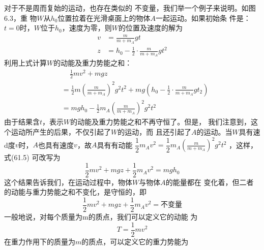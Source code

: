 对于不是周而复始的运动，也存在类似的
不变量，我们举一个例子来说明。如图6.3，重
物$ W $从$ h _ { 0 } $位置拉着在光滑桌面上的物体$ A $一起运动。如果初始条
件是：$ t = 0 $时，$ W $位于$ h _ { 0 } $，速度为零，则$ W $的位置及速度的解为
\begin{equation*}
 \begin{aligned}
 v &= \frac { m } { m + m _ { A } } g t \\
 z &= h _ { 0 } - \frac { 1 } { 2 } \cdot \frac { m } { m + m _ { A } } g t ^ { 2 }
 \end{aligned}
\end{equation*}
利用上式计算$ W $的动能及重力势能之和：
{\setlength{\mathindent}{2em}
\begin{equation}\label{eqn:06.01.05}
 \begin{aligned}
 &\quad \, \frac { 1 } { 2 } m v ^ { 2 } + m g z \\
 &= \frac { 1 } { 2 } m \left( \frac { m } { m + m _ { A } } \right) ^ { 2 } g ^ { 2 } t ^ { 2 } + m g \left( h _ { 0 } - \frac { 1 } { 2 } \cdot \frac { m } { m + m _ { A } } g t _ { 2 } \right) \\
 &= m g h _ { 0 } - \frac { 1 } { 2 } m _ { A } \left( \frac { m } { m + m _ { A } } \right) ^ { 2 } g ^ { 2 } t ^ { 2 }
 \end{aligned}
\end{equation}}
由于结果含$ t $，表示$ W $的动能及重力势能之和不再守恒了。但是，
我们注意到，这个运动所产生的后果，不仅引起了$ W $的运动，而
且还引起了$ A $的运动。当$ W $具有速d度$ v $时，$ A $也具有速度$ v $，故$ A $具有有动能
$ \dfrac { 1 } { 2 } m _ { A } v ^ { 2 } = \dfrac { 1 } { 2 } m _ { A } \left( \frac { m } { m + m _ { A } } \right) ^ { 2 } g ^ { 2 } t ^ { 2 } $
，这样，式(61.5)
可改写为
\begin{equation*}
 \frac { 1 } { 2 } m v ^ { 2 } + m g z + \frac { 1 } { 2 } m _ { A } v ^ { 2 } = m g h _ { 0 }
\end{equation*}
这个结果告诉我们，在运动过程中，物体$ W $与物体$ A $的能量都在
变化着，但二者的动能与重力势能之和不变化，是守恒的，即
\begin{equation}\label{eqn:06.01.06}
 \frac { 1 } { 2 } m v ^ { 2 } + m g z + \frac { 1 } { 2 } m _ { A } v ^ { 2 } = \text{不变量}
\end{equation}
一般地说，对每个质量为m的质点，我们可以定义它的动能
为
\begin{equation*}
 T = \frac { 1 } { 2 } m v ^ { 2 }
\end{equation*}
在重力作用下的质量为$ m $的质点，可以定义它的重力势能为
